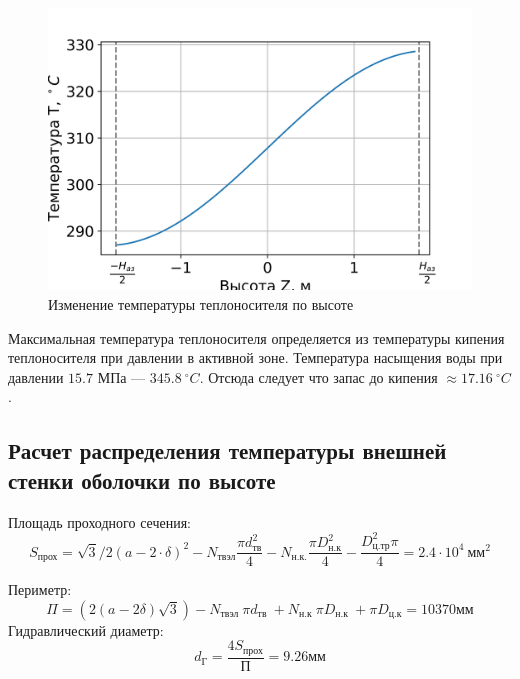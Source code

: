 \begin{figure}[H]
	\begin{center}
		\includegraphics[]{Tz.png}
		\caption{Изменение температуры теплоносителя по высоте}
		\label{pic:TZ} %
	\end{center}
\end{figure}

Максимальная температура теплоносителя определяется из температуры кипения теплоносителя при давлении в активной зоне. Температура насыщения воды при давлении $15.7$ МПа — $345.8\  ^\circ C$. Отсюда следует что запас до кипения $\approx 17.16\  ^\circ C$. 

\subsection{Расчет распределения температуры внешней стенки оболочки по высоте}
Площадь проходного сечения:
$$
S_{\text{прох}} = \sqrt{3}/2(a - 2 \cdot \delta)^2 - N_{\text{твэл}} \frac {\pi d^2_{\text{тв}}} {4} - N_{\text{н.к.}} \frac {\pi D_{\text{н.к}}^2} {4} - \frac {D_{\text{ц.тр}}^2\pi}{4} = 2.4 \cdot 10^4\ \text{мм}^2
$$

Периметр:
$$
\Pi= (2(a-2\delta)\sqrt{3}) - N_{\text {твэл }} \pi d_{\text {тв }}+N_{\text {н.к }} \pi D_{\text {н.к }}+\pi D_{\text {ц.к}}= 10370 \text{мм}
$$
Гидравлический диаметр:
$$
d_{\text{Г}} = \frac {4 S_{\text{прох}}}{\text{П}} = 9.26 \text{мм} 
$$


